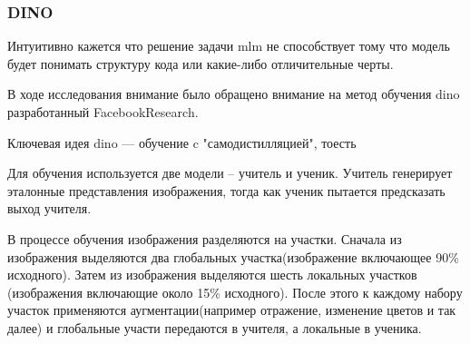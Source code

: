 \documentclass[../part_1.tex]{subfiles}
\begin{document}
    \subsubsection{DINO}
    \par Интуитивно кажется что решение задачи \acrshort{mlm} не способствует тому что модель будет понимать структуру кода или какие-либо отличительные черты. 
    \par В ходе исследования внимание было обращено внимание на метод обучения \acrshort{dino}\cite{caron2021emergingpropertiesselfsupervisedvision,oquab2024dinov2learningrobustvisual,darcet2024visiontransformersneedregisters} разработанный FacebookResearch. %
    \par Ключевая идея \acrshort{dino} — обучение c "самодистилляцией", тоесть %
    \par Для обучения используется две модели -- учитель и ученик. Учитель генерирует эталонные представления изображения, тогда как ученик пытается предсказать выход учителя. %
    \par В процессе обучения изображения разделяются на участки. Сначала из изображения выделяются два глобальных участка(изображение включающее 90\% исходного). Затем из изображения выделяются шесть локальных участков (изображения включающие около 15\% исходного). После этого к каждому набору участок применяются аугментации(например отражение, изменение цветов и так далее) и глобальные участи передаются в учителя, а локальные в ученика.
\end{document}
